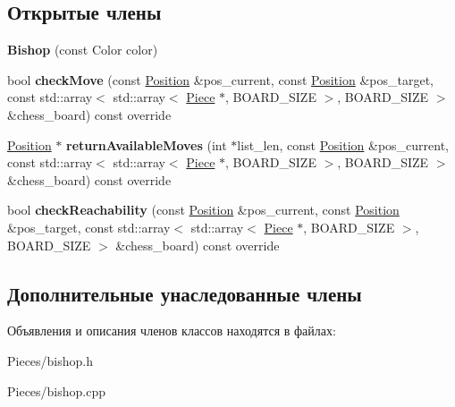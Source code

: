\subsection*{Открытые члены}
\begin{DoxyCompactItemize}
\item 
\mbox{\label{class_chess_1_1_bishop_a08f1b7e3e379c168958ab6819638d014}} 
{\bfseries Bishop} (const Color color)
\item 
\mbox{\label{class_chess_1_1_bishop_aafc2055191d4ba9df719ca8d35fd3a01}} 
bool {\bfseries check\+Move} (const \mbox{\hyperlink{class_chess_1_1_position}{Position}} \&pos\+\_\+current, const \mbox{\hyperlink{class_chess_1_1_position}{Position}} \&pos\+\_\+target, const std\+::array$<$ std\+::array$<$ \mbox{\hyperlink{class_chess_1_1_piece}{Piece}} $\ast$, B\+O\+A\+R\+D\+\_\+\+S\+I\+ZE $>$, B\+O\+A\+R\+D\+\_\+\+S\+I\+ZE $>$ \&chess\+\_\+board) const override
\item 
\mbox{\label{class_chess_1_1_bishop_a235bab243b981b2d50f8694bbb9e2e77}} 
\mbox{\hyperlink{class_chess_1_1_position}{Position}} $\ast$ {\bfseries return\+Available\+Moves} (int $\ast$list\+\_\+len, const \mbox{\hyperlink{class_chess_1_1_position}{Position}} \&pos\+\_\+current, const std\+::array$<$ std\+::array$<$ \mbox{\hyperlink{class_chess_1_1_piece}{Piece}} $\ast$, B\+O\+A\+R\+D\+\_\+\+S\+I\+ZE $>$, B\+O\+A\+R\+D\+\_\+\+S\+I\+ZE $>$ \&chess\+\_\+board) const override
\item 
\mbox{\label{class_chess_1_1_bishop_acad16beae041ce1e7d34b2cac9d6d0f9}} 
bool {\bfseries check\+Reachability} (const \mbox{\hyperlink{class_chess_1_1_position}{Position}} \&pos\+\_\+current, const \mbox{\hyperlink{class_chess_1_1_position}{Position}} \&pos\+\_\+target, const std\+::array$<$ std\+::array$<$ \mbox{\hyperlink{class_chess_1_1_piece}{Piece}} $\ast$, B\+O\+A\+R\+D\+\_\+\+S\+I\+ZE $>$, B\+O\+A\+R\+D\+\_\+\+S\+I\+ZE $>$ \&chess\+\_\+board) const override
\end{DoxyCompactItemize}
\subsection*{Дополнительные унаследованные члены}


Объявления и описания членов классов находятся в файлах\+:\begin{DoxyCompactItemize}
\item 
Pieces/bishop.\+h\item 
Pieces/bishop.\+cpp\end{DoxyCompactItemize}
